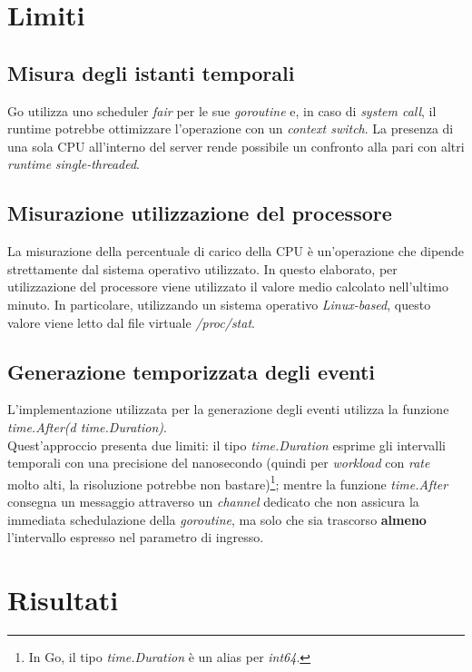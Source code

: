 \section{Limiti}\label{s:limiti}

\subsection{Misura degli istanti temporali}
Go utilizza uno scheduler \textit{fair} per le sue \textit{goroutine} e, in caso di \textit{system call}, il runtime potrebbe ottimizzare l'operazione con un \textit{context switch}. La presenza di una sola CPU all'interno del server rende possibile un confronto alla pari con altri \textit{runtime} \textit{single-threaded}. 

\subsection{Misurazione utilizzazione del processore}
La misurazione della percentuale di carico della CPU è un'operazione che dipende strettamente dal sistema operativo utilizzato. In questo elaborato, per utilizzazione del processore viene utilizzato il valore medio calcolato nell'ultimo minuto. In particolare, utilizzando un sistema operativo \textit{Linux-based}, questo valore viene letto dal file virtuale \textit{/proc/stat}.

\subsection{Generazione temporizzata degli eventi}
L'implementazione utilizzata per la generazione degli eventi utilizza la funzione \textit{time.After(d time.Duration)}.\\
Quest'approccio presenta due limiti: il tipo \textit{time.Duration} esprime gli intervalli temporali con una precisione del nanosecondo (quindi per \textit{workload} con \textit{rate} molto alti, la risoluzione potrebbe non bastare)\footnote{In Go, il tipo \textit{time.Duration} è un alias per \textit{int64}.}; mentre la funzione \textit{time.After} consegna un messaggio attraverso un \textit{channel} dedicato che non assicura la immediata schedulazione della \textit{goroutine}, ma solo che sia trascorso \textbf{almeno} l'intervallo espresso nel parametro di ingresso.

\section{Risultati}\label{s:risultati}

